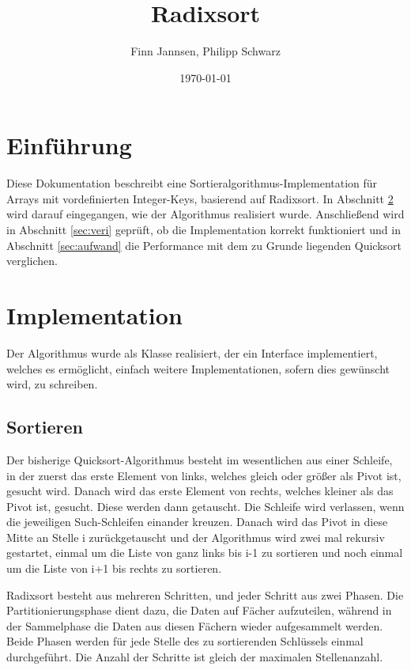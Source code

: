 \documentclass[11pt]{scrartcl}
\title{Radixsort}
\author{Finn Jannsen, Philipp Schwarz}
\date{\today{}}
\begin{document}
\maketitle

\tableofcontents

\section{Einführung}
	\label{sec:einfuehrung}
	
	Diese Dokumentation beschreibt eine Sortieralgorithmus-Implementation für Arrays mit vordefinierten Integer-Keys, basierend auf Radixsort.
	In Abschnitt \ref{sec:implementation} wird darauf eingegangen, wie der Algorithmus realisiert wurde.
	Anschließend wird in Abschnitt \ref{sec:veri} geprüft, ob die Implementation korrekt funktioniert 
	und in Abschnitt \ref{sec:aufwand} die Performance mit dem zu Grunde liegenden Quicksort verglichen.

\section{Implementation}
	\label{sec:implementation}
	
	Der Algorithmus wurde als Klasse realisiert, der ein Interface implementiert, welches es ermöglicht, einfach weitere Implementationen, sofern dies gewünscht wird, zu schreiben.
	
	\subsection{Sortieren}
		\label{sec:sortAlgo}
		
		Der bisherige Quicksort-Algorithmus besteht im wesentlichen aus einer Schleife, in der zuerst das erste Element von links, welches gleich oder größer als Pivot ist, gesucht wird.
		Danach wird das erste Element von rechts, welches kleiner als das Pivot ist, gesucht. Diese werden dann getauscht.
		Die Schleife wird verlassen, wenn die jeweiligen Such-Schleifen einander kreuzen.
		Danach wird das Pivot in diese Mitte an Stelle i zurückgetauscht und der Algorithmus wird zwei mal rekursiv gestartet,
		einmal um die Liste von ganz links bis i-1 zu sortieren und noch einmal um die Liste von i+1 bis rechts zu sortieren.

		Radixsort besteht aus mehreren Schritten, und jeder Schritt aus zwei Phasen. 
        Die Partitionierungsphase dient dazu, die Daten auf Fächer aufzuteilen, während in der Sammelphase die Daten aus diesen Fächern wieder aufgesammelt werden. 
        Beide Phasen werden für jede Stelle des zu sortierenden Schlüssels einmal durchgeführt. Die Anzahl der Schritte ist gleich der maximalen Stellenanzahl. 
\end{document}
